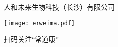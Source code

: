 \vspace*{.5mm}

\noindent\colorbox{topcolor}{
\parbox{0.6\hsize}{
\color{white}\fontsize{9pt}{\baselineskip}\selectfont { 再次感谢您的信任和支持！}
}
}

\vspace*{3mm}

\hfill\fontsize{9pt}{11pt}\selectfont 人和未来生物科技（长沙）有限公司

\vspace*{-2mm}

\hfill\texttt{[image: erweima.pdf]}


\hfill\fontsize{9pt}{11pt}\selectfont 扫码关注“常道康”


